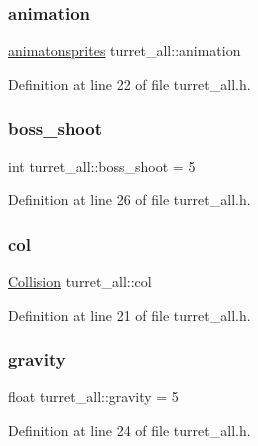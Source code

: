 \subsubsection{\texorpdfstring{animation}{animation}}
{\footnotesize\ttfamily \hyperlink{classanimatonsprites}{animatonsprites} turret\+\_\+all\+::animation}



Definition at line 22 of file turret\+\_\+all.\+h.

\hypertarget{classturret__all_a5ea63184c3e11cdfa233f99f3aaadd69}{}\label{classturret__all_a5ea63184c3e11cdfa233f99f3aaadd69} 
\subsubsection{\texorpdfstring{boss\+\_\+shoot}{boss\_shoot}}
{\footnotesize\ttfamily int turret\+\_\+all\+::boss\+\_\+shoot = 5}



Definition at line 26 of file turret\+\_\+all.\+h.

\hypertarget{classturret__all_af94d8c16e0c4896dfc229e0f6dee32c2}{}\label{classturret__all_af94d8c16e0c4896dfc229e0f6dee32c2} 
\subsubsection{\texorpdfstring{col}{col}}
{\footnotesize\ttfamily \hyperlink{class_collision}{Collision} turret\+\_\+all\+::col}



Definition at line 21 of file turret\+\_\+all.\+h.

\hypertarget{classturret__all_a8d25c14dd820c6725616fa8eb7978cc8}{}\label{classturret__all_a8d25c14dd820c6725616fa8eb7978cc8} 
\subsubsection{\texorpdfstring{gravity}{gravity}}
{\footnotesize\ttfamily float turret\+\_\+all\+::gravity = 5}



Definition at line 24 of file turret\+\_\+all.\+h.

